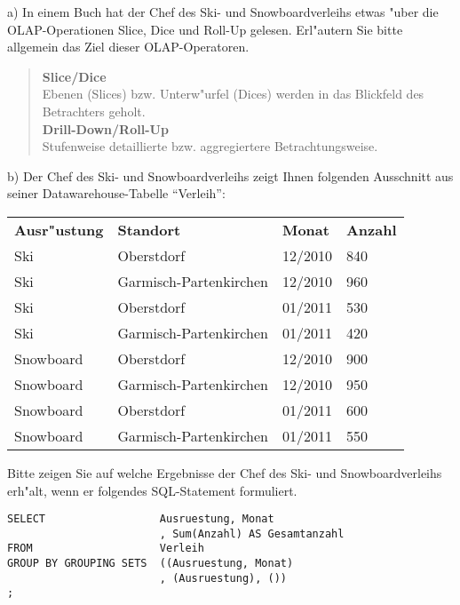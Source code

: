 \noindent
a) In einem Buch hat der Chef des Ski- und Snowboardverleihs etwas "uber die OLAP-Operationen Slice, Dice und Roll-Up gelesen.
Erl"autern Sie bitte allgemein das Ziel dieser OLAP-Operatoren.

\begin{quote}
    \textbf{Slice/Dice}\\
    Ebenen (Slices) bzw. Unterw"urfel (Dices) werden in das Blickfeld des Betrachters geholt.\\
    \textbf{Drill-Down/Roll-Up}\\
    Stufenweise detaillierte bzw. aggregiertere Betrachtungsweise.\\
\end{quote}

\noindent
b) Der Chef des Ski- und Snowboardverleihs zeigt Ihnen folgenden Ausschnitt aus seiner Datawarehouse-Tabelle "`Verleih"':\\

\begin{tabular}{ l l l l }
    \rowcolor{LightSlateGrey}
    \textbf{Ausr"ustung} & \textbf{Standort} & \textbf{Monat} & \textbf{Anzahl}\\
    Ski         & Oberstdorf                & 12/2010   & 840\\
    Ski         & Garmisch-Partenkirchen    & 12/2010   & 960\\
    Ski         & Oberstdorf                & 01/2011   & 530\\
    Ski         & Garmisch-Partenkirchen    & 01/2011   & 420\\
    Snowboard   & Oberstdorf                & 12/2010   & 900\\
    Snowboard   & Garmisch-Partenkirchen    & 12/2010   & 950\\
    Snowboard   & Oberstdorf                & 01/2011   & 600\\
    Snowboard   & Garmisch-Partenkirchen    & 01/2011   & 550\\
\end{tabular}

\bigskip

\noindent
Bitte zeigen Sie auf welche Ergebnisse der Chef des Ski- und Snowboardverleihs erh"alt, wenn er folgendes SQL-Statement formuliert.\\

\lstset{style=customSQL}
\begin{lstlisting}
SELECT                  Ausruestung, Monat
                        , Sum(Anzahl) AS Gesamtanzahl
FROM                    Verleih
GROUP BY GROUPING SETS  ((Ausruestung, Monat)
                        , (Ausruestung), ())
;
\end{lstlisting}

